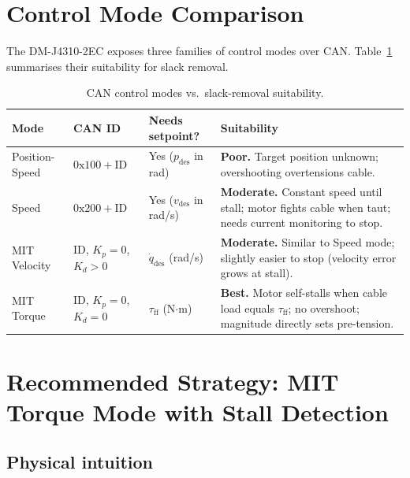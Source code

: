 \documentclass[11pt,a4paper]{article}
\begin{document}
\section{Control Mode Comparison}
\label{sec:modes}

The DM-J4310-2EC exposes three families of control modes over CAN.
Table~\ref{tab:modes} summarises their suitability for slack removal.

\begin{table}[ht]
\centering
\caption{CAN control modes vs.\ slack-removal suitability.}
\label{tab:modes}
\begin{tabular}{lllp{5cm}}
\toprule
Mode & CAN ID & Needs setpoint? & Suitability \\
\midrule
Position-Speed & $0\text{x}100 + \text{ID}$ & Yes ($p_\text{des}$ in rad)
  & \textbf{Poor.}  Target position unknown; overshooting overtensions cable. \\
Speed & $0\text{x}200 + \text{ID}$ & Yes ($v_\text{des}$ in rad/s)
  & \textbf{Moderate.}  Constant speed until stall; motor fights cable
    when taut; needs current monitoring to stop. \\
MIT Velocity & $\text{ID}$, $K_p=0$, $K_d>0$ & $\dot q_\text{des}$ (rad/s)
  & \textbf{Moderate.}  Similar to Speed mode; slightly easier to stop
    (velocity error grows at stall). \\
MIT Torque & $\text{ID}$, $K_p=0$, $K_d=0$ & $\tau_\text{ff}$ (N$\cdot$m)
  & \textbf{Best.}  Motor self-stalls when cable load equals $\tau_\text{ff}$;
    no overshoot; magnitude directly sets pre-tension. \\
\bottomrule
\end{tabular}
\end{table}

\section{Recommended Strategy: MIT Torque Mode with Stall Detection}
\label{sec:strategy}

\subsection{Physical intuition}
\end{document}
